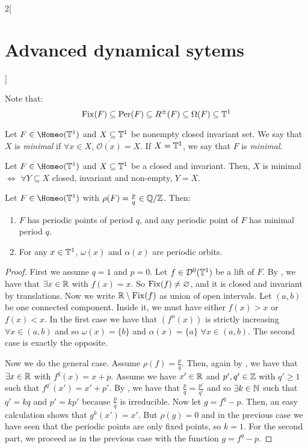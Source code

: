 \documentclass[../../../main_math.tex]{subfiles}
\begin{document}
\begin{multicols}{2}[\section{Advanced dynamical sytems}]
\begin{proposition}
  \end{proposition}
  \begin{remark}
    Note that:
    $$
      \mathrm{Fix}(F)\subseteq \operatorname{Per}(F)\subseteq R^\pm(F)\subseteq \Omega(F)\subseteq \mathbb{T}^1
    $$
  \end{remark}
  \begin{definition}
    Let $F\in \Homeo(\TT^1)$ and $X\subseteq \mathbb{T}^1$ be nonempty closed invariant set. We say that $X$ is \emph{minimal} if $\forall x\in X$, $\overline{\mathcal{O}(x)}=X$. If $X=\mathbb{T}^1$, we say that $F$ is \emph{minimal}.
  \end{definition}
  \begin{proposition}
    Let $F\in \Homeo(\TT^1)$ and $X\subseteq \mathbb{T}^1$ be a closed and invariant. Then, $X$ is minimal $\iff$ $\forall Y\subseteq X$ closed, invariant and non-empty, $Y=X$.
  \end{proposition}
  \begin{theorem}
    Let $F\in \Homeo(\TT^1)$ with $\rho(F)=\frac{p}{q}\in \quot{\QQ}{\ZZ}$. Then:
    \begin{enumerate}
      \item $F$ has periodic points of period $q$, and any periodic point of $F$ has minimal period $q$.
      \item For any $x\in \mathbb{T}^1$, $\omega(x)$ and $\alpha(x)$ are periodic orbits.
    \end{enumerate}
  \end{theorem}
  \begin{proof}
    First we assume $q=1$ and $p=0$. Let $f\in \mathcal{D}^0(\mathbb{T}^1)$ be a lift of $F$. By , we have that $\exists x\in \mathbb{R}$ with $f(x)=x$. So $\mathrm{Fix}(f)\ne \varnothing$, and it is closed and invariant by translations. Now we write $\mathbb{R}\setminus\mathrm{Fix}(f)$ as union of open intervals. Let $(a,b)$ be one connected component. Inside it, we must have either $f(x)>x$ or $f(x)<x$. In the first case we have that $(f^n(x))$ is strictly increasing $\forall x\in (a,b)$ and so $\omega(x)=\{b\}$ and $\alpha(x)=\{a\}$ $\forall x\in(a,b)$. The second case is exactly the opposite.

    Now we do the general case. Assume $\rho(f)=\frac{p}{q}$. Then, again by , we have that $\exists x\in \mathbb{R}$ with $f^q(x)=x+p$. Assume we have $x'\in\mathbb{R}$ and $p',q'\in\mathbb{Z}$ with $q'\geq 1$ such that $f^{q'}(x')=x'+p'$. By , we have that $\frac{p}{q}=\frac{p'}{q'}$ and so $\exists k\in\mathbb{N}$ such that $q'=kq$ and $p'=kp'$ because $\frac{p}{q}$ is irreducible. Now let $g=f^q-p$. Then, an easy calculation shows that $g^k(x')=x'$. But $\rho(g)=0$ and in the previous case we have seen that the periodic points are only fixed points, so $k=1$. For the second part, we proceed as in the previous case with the function $g=f^q-p$.
  \end{proof}

\end{multicols}
\end{document}

